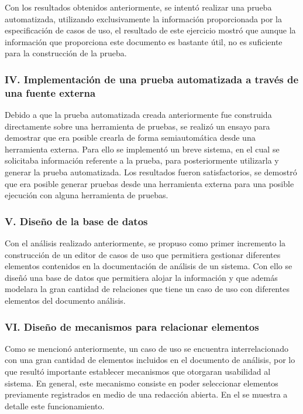 	Con los resultados obtenidos anteriormente, se intentó realizar una prueba automatizada, utilizando exclusivamente la información proporcionada por la especificación de casos de uso, el resultado de este ejercicio mostró que aunque la información que proporciona este documento es bastante útil, no es suficiente para la construcción de la prueba.
		
\subsubsection{IV. Implementación de una prueba automatizada a través de una fuente externa}
	
	Debido a que la prueba automatizada creada anteriormente fue construida directamente sobre una herramienta de pruebas, se realizó un ensayo para demostrar que era posible crearla de forma semiautomática desde una herramienta externa. Para ello se implementó un breve sistema, en el cual se solicitaba información referente a la prueba, para posteriormente utilizarla y generar la prueba automatizada. Los resultados fueron satisfactorios, se demostró que era posible generar pruebas desde una herramienta externa para una posible ejecución con alguna herramienta de pruebas.
		
\subsubsection{V. Diseño de la base de datos}

	Con el análisis realizado anteriormente, se propuso como primer incremento la construcción de un editor de casos de uso que permitiera gestionar diferentes elementos contenidos en la documentación de análisis de un sistema. Con ello se diseñó una base de datos que permitiera alojar la información y que además modelara la gran cantidad de relaciones que tiene un caso de uso con diferentes elementos del documento análisis.
			
\subsubsection{VI. Diseño de mecanismos para relacionar elementos}

	Como se mencionó anteriormente, un caso de uso se encuentra interrelacionado con una gran cantidad de elementos incluidos en el documento de análisis, por lo que resultó importante establecer mecanismos que otorgaran usabilidad al sistema. En general, este mecanismo consiste en poder seleccionar elementos previamente registrados en medio de una redacción abierta. En el  se muestra a detalle este funcionamiento.

	 